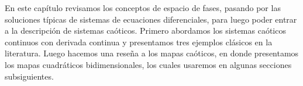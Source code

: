 En este capítulo revisamos los conceptos de espacio de fases, pasando por las soluciones típicas de sistemas de ecuaciones diferenciales, para luego poder entrar a la descripción de sistemas caóticos. Primero abordamos los sistemas caóticos continuos con derivada continua y presentamos tres ejemplos clásicos en la literatura. Luego hacemos una reseña a los mapas caóticos, en donde presentamos los mapas cuadráticos bidimensionales, los cuales usaremos en algunas secciones subsiguientes.
